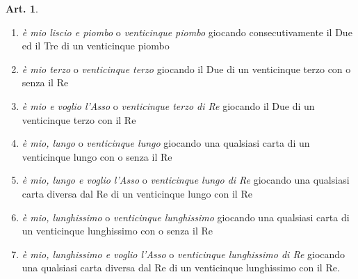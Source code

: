 \documentclass[italian,a4paper]{article}
\theoremstyle{definition}
\newtheorem{art}{Art.}
\begin{document}
\begin{art}
\begin{enumerate}
\item      \emph{è mio liscio e piombo} o \emph{venticinque piombo} giocando
consecutivamente il Due ed il Tre di un venticinque piombo

\item      \emph{è mio terzo} o \emph{venticinque terzo} giocando il Due di un venticinque
terzo con o senza il Re

\item      \emph{è mio e voglio l’Asso} o \emph{venticinque terzo di Re} giocando il Due
di un venticinque terzo con il Re

\item      \emph{è mio, lungo} o \emph{venticinque lungo} giocando una qualsiasi carta di
un venticinque lungo con o senza il Re

\item      \emph{è mio, lungo e voglio l’Asso} o \emph{venticinque lungo di Re} giocando
una qualsiasi carta diversa dal Re di un venticinque lungo con il Re

\item      \emph{è mio, lunghissimo} o \emph{venticinque lunghissimo} giocando una
qualsiasi carta di un venticinque lunghissimo con o senza il Re

\item      \emph{è mio, lunghissimo e voglio l’Asso} o \emph{venticinque
    lunghissimo di Re} giocando una qualsiasi carta diversa dal Re di un venticinque lunghissimo
con il Re.
\end{enumerate}
\end{art}
\end{document}
